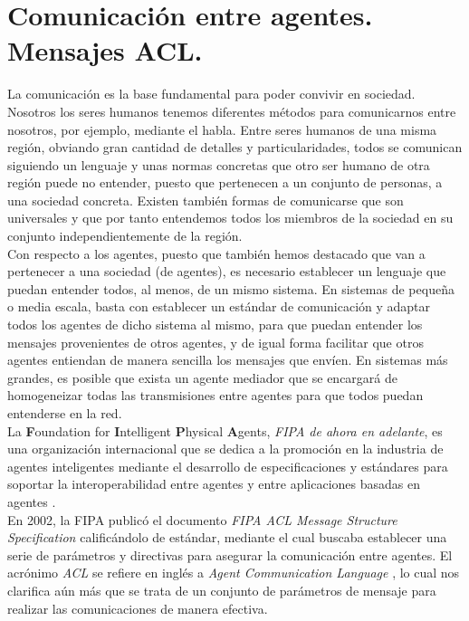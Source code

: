 \section{Comunicación entre agentes. Mensajes ACL.}

La comunicación es la base fundamental para poder convivir en sociedad. Nosotros los seres humanos tenemos diferentes métodos para comunicarnos entre nosotros, por ejemplo, mediante el habla. Entre seres humanos de una misma región, obviando gran cantidad de detalles y particularidades, todos se comunican siguiendo un lenguaje y unas normas concretas que otro ser humano de otra región puede no entender, puesto que pertenecen a un conjunto de personas, a una sociedad concreta. Existen también formas de comunicarse que son universales y que por tanto entendemos todos los miembros de la sociedad en su conjunto independientemente de la región.\\

Con respecto a los agentes, puesto que también hemos destacado que van a pertenecer a una sociedad (de agentes), es necesario establecer un lenguaje que puedan entender todos, al menos, de un mismo sistema. En sistemas de pequeña o media escala, basta con establecer un estándar de comunicación y adaptar todos los agentes de dicho sistema al mismo, para que puedan entender los mensajes provenientes de otros agentes, y de igual forma facilitar que otros agentes entiendan de manera sencilla los mensajes que envíen. En sistemas más grandes, es posible que exista un agente mediador que se encargará de homogeneizar todas las transmisiones entre agentes para que todos puedan entenderse en la red.\\

La \textbf{F}oundation for \textbf{I}ntelligent \textbf{P}hysical \textbf{A}gents, \textit{FIPA de ahora en adelante}, es una organización internacional que se dedica a la promoción en la industria de agentes inteligentes mediante el desarrollo de especificaciones y estándares para soportar la interoperabilidad entre agentes y entre aplicaciones basadas en agentes \cite{unknown-author-2002B}.\\

En 2002, la FIPA publicó el documento \textit{FIPA ACL Message Structure Specification} \cite{unknown-author-2002B} calificándolo de estándar, mediante el cual buscaba establecer una serie de parámetros y directivas para asegurar la comunicación entre agentes. El acrónimo \textit{ACL} se refiere en inglés a \textit{Agent Communication Language} \cite{JADEMessage}, lo cual nos clarifica aún más que se trata de un conjunto de parámetros de mensaje para realizar las comunicaciones de manera efectiva.\\

